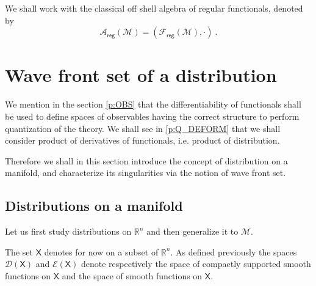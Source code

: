 \documentclass[12pt]{book}
\newcommand{\reg}{\mathsf{reg}}
\newcommand{\Acal}{\mathcal{A}}
\newcommand{\Dcal}{\mathcal{D}}
\newcommand{\Ecal}{\mathcal{E}}
\newcommand{\Fcal}{\mathcal{F}}
\newcommand{\Mcal}{\mathcal{M}}
\newcommand{\Rbb}{\mathbb{R}}
\newcommand{\Xsf}{\mathsf{X}}
\theoremstyle{break}
\begin{document}


We shall work with the classical off shell algebra of regular functionals, denoted by
%
\begin{equation*}
\Acal_\reg(\Mcal) = \left(\Fcal_\reg(\Mcal), \cdot\right) \ . 
\end{equation*}





\section{Wave front set of a distribution}


We mention in the section \ref{p:OBS} that the differentiability of functionals shall be used to define spaces of observables having the correct structure to perform quantization of the theory. We shall see in \ref{p:Q_DEFORM} that we shall consider product of derivatives of functionals, i.e. product of distribution. 




Therefore we shall in this section introduce the concept of distribution on a manifold, and characterize its singularities via the notion of wave front set.


\subsection{Distributions on a manifold}\label{p:DISTRIB}


Let us first study distributions on $\Rbb^n$ and then generalize it to $\Mcal$. 



The set $\Xsf$ denotes for now on a subset of $\Rbb^n$. As defined previously the spaces $\Dcal(\Xsf)$ and $\Ecal(\Xsf)$ denote respectively the space of compactly supported smooth functions on $\Xsf$ and the space of smooth functions on $\Xsf$.


\end{document}
